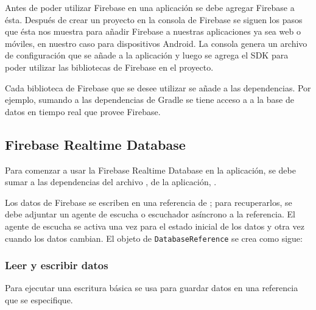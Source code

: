 Antes de poder utilizar Firebase en una aplicación se debe agregar Firebase a ésta. Después de crear un proyecto en la consola 
de Firebase se siguen los pasos que ésta nos muestra
para añadir Firebase a nuestras aplicaciones ya sea web 
o móviles, en nuestro caso para dispositivos Android.
La consola genera un archivo de configuración
que se añade a la aplicación y luego
se agrega el SDK para poder utilizar las bibliotecas de Firebase en el proyecto.

Cada biblioteca de Firebase que se desee utilizar se añade a las dependencias.
Por ejemplo, sumando a las dependencias de Gradle  
se tiene acceso a a la base de datos en tiempo real que provee Firebase.


\subsection*{Firebase Realtime Database}
\label{\detokenize{dev_docs:firebase-realtime-database}}
Para comenzar a usar la Firebase Realtime Database en la aplicación,
se debe sumar a las dependencias del archivo , de la aplicación,
.

Los datos de Firebase se escriben en una referencia de ;
para recuperarlos, se debe adjuntar un agente de escucha o escuchador asíncrono a la
referencia. El agente de escucha se activa una vez para el estado inicial de los
datos y otra vez cuando los datos cambian. El objeto de \texttt{DatabaseReference}
se crea como sigue:


%


%
\begin{sphinxVerbatim}[commandchars=\\\{\}]
  
  
\end{sphinxVerbatim}


\subsubsection{Leer y escribir datos}
\label{\detokenize{dev_docs:leer-y-escribir-datos}}
Para ejecutar una escritura básica se usa  para guardar datos en
una referencia que se especifique.

